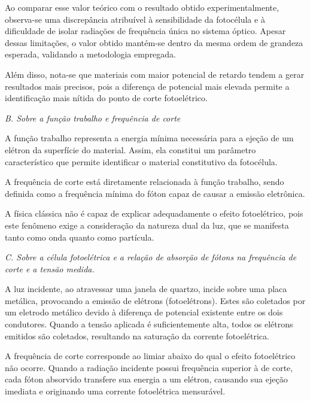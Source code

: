 \documentclass[10pt,twocolumn,letterpaper]{article}
\begin{document}
\vspace{-.22cm}

\hspace{1cm} Ao comparar esse valor teórico com o resultado obtido experimentalmente, observa-se uma discrepância atribuível à sensibilidade da fotocélula e à dificuldade de isolar radiações de frequência única no sistema óptico. Apesar dessas limitações, o valor obtido mantém-se dentro da mesma ordem de grandeza esperada, validando a metodologia empregada.

\hspace{1cm} Além disso, nota-se que materiais com maior potencial de retardo tendem a gerar resultados mais precisos, pois a diferença de potencial mais elevada permite a identificação mais nítida do ponto de corte fotoelétrico.

\noindent\textit{B. Sobre a função trabalho e frequência de corte}

\hspace{1cm} A função trabalho representa a energia mínima necessária para a ejeção de um elétron da superfície do material. Assim, ela constitui um parâmetro característico que permite identificar o material constitutivo da fotocélula.

\hspace{1cm} A frequência de corte está diretamente relacionada à função trabalho, sendo definida como a frequência mínima do fóton capaz de causar a emissão eletrônica.

\hspace{1cm} A física clássica não é capaz de explicar adequadamente o efeito fotoelétrico, pois este fenômeno exige a consideração da natureza dual da luz, que se manifesta tanto como onda quanto como partícula.

\noindent\textit{C. Sobre a célula fotoelétrica e a relação de absorção de
fótons na frequência de corte e a tensão medida.}

\hspace{1cm} A luz incidente, ao atravessar uma janela de quartzo, incide sobre uma placa metálica, provocando a emissão de elétrons (fotoelétrons). Estes são coletados por um eletrodo metálico devido à diferença de potencial existente entre os dois condutores.
Quando a tensão aplicada é suficientemente alta, todos os elétrons emitidos são coletados, resultando na saturação da corrente fotoelétrica.

\hspace{1cm} A frequência de corte corresponde ao limiar abaixo do qual o efeito fotoelétrico não ocorre. Quando a radiação incidente possui frequência superior à de corte, cada fóton absorvido transfere sua energia a um elétron, causando sua ejeção imediata e originando uma corrente fotoelétrica mensurável.
\end{document}
